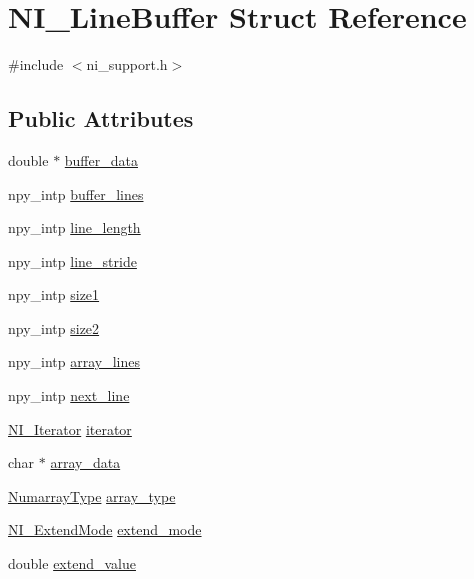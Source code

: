 \hypertarget{structNI__LineBuffer}{}\section{N\+I\+\_\+\+Line\+Buffer Struct Reference}
\label{structNI__LineBuffer}


{\ttfamily \#include $<$ni\+\_\+support.\+h$>$}

\subsection*{Public Attributes}
\begin{DoxyCompactItemize}
\item 
double $\ast$ \hyperlink{structNI__LineBuffer_ad33b997d2c00c8e4ec70ad956f0fc029}{buffer\+\_\+data}
\item 
npy\+\_\+intp \hyperlink{structNI__LineBuffer_a9fddd2a1b0b9d9a54bd9c56151b8e8b7}{buffer\+\_\+lines}
\item 
npy\+\_\+intp \hyperlink{structNI__LineBuffer_a7f94bba68b4e376bed45bd5cf9148ac3}{line\+\_\+length}
\item 
npy\+\_\+intp \hyperlink{structNI__LineBuffer_abf2d8d1e3cd1de9f2b10eee45e8494fc}{line\+\_\+stride}
\item 
npy\+\_\+intp \hyperlink{structNI__LineBuffer_a48f03039108dbcb38163cc54a5a22742}{size1}
\item 
npy\+\_\+intp \hyperlink{structNI__LineBuffer_af76e9c1491086e07b62c48c6bbf1fa41}{size2}
\item 
npy\+\_\+intp \hyperlink{structNI__LineBuffer_a74c2ce8edeaddc1a8778c8a6565b9145}{array\+\_\+lines}
\item 
npy\+\_\+intp \hyperlink{structNI__LineBuffer_afc9d998ff01169b1830543a98d52a295}{next\+\_\+line}
\item 
\hyperlink{structNI__Iterator}{N\+I\+\_\+\+Iterator} \hyperlink{structNI__LineBuffer_a0c2f49e0864e8fbf30408a9d24dcce95}{iterator}
\item 
char $\ast$ \hyperlink{structNI__LineBuffer_ac84c5b8a16baac7304a42ca54394ea70}{array\+\_\+data}
\item 
\hyperlink{nd__image_8h_a610fc4016e276ce98c9dc6e28f6d22fb}{Numarray\+Type} \hyperlink{structNI__LineBuffer_a13491104ad2455d9c825806367eb0d03}{array\+\_\+type}
\item 
\hyperlink{ni__support_8h_a07581b5249763908e2c9c86b18c617fa}{N\+I\+\_\+\+Extend\+Mode} \hyperlink{structNI__LineBuffer_a395cf9007498864db357b651900c5241}{extend\+\_\+mode}
\item 
double \hyperlink{structNI__LineBuffer_a665a1e9768c7401c351f45e0630c211e}{extend\+\_\+value}
\end{DoxyCompactItemize}


